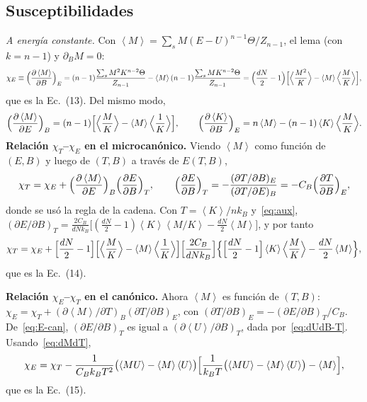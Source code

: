 \documentclass[11pt,letterpaper]{article}
\newcommand{\avg}[1]{\left\langle #1 \right\rangle}
\newcommand{\kB}{k_{B}}
\begin{document}
\subsection{Susceptibilidades}
\emph{A energía constante.} Con $\avg M=\sum_sM(E-U)^{n-1}\Theta/Z_{n-1}$, el lema
(con $k=n-1$) y $\partial_BM=0$:
\begin{equation}
\chi_E\equiv\Bigl(\frac{\partial\avg M}{\partial B}\Bigr)_E
=(n-1)\frac{\sum_sM^2K^{n-2}\Theta}{Z_{n-1}}-\avg M(n-1)\frac{\sum_sMK^{n-2}\Theta}{Z_{n-1}}
=\Bigl(\frac{dN}{2}-1\Bigr)\Bigl[\Bigl\langle\frac{M^2}{K}\Bigr\rangle-\avg M\Bigl\langle\frac MK\Bigr\rangle\Bigr],
\label{eq:chiE}
\end{equation}
que es la Ec.~(13). Del mismo modo,
\begin{equation}
\Bigl(\frac{\partial\avg M}{\partial E}\Bigr)_B=(n-1)\Bigl[\Bigl\langle\frac MK\Bigr\rangle-\avg M\Bigl\langle\frac1K\Bigr\rangle\Bigr],
\qquad
\Bigl(\frac{\partial\avg K}{\partial B}\Bigr)_E=n\avg M-(n-1)\avg K\Bigl\langle\frac MK\Bigr\rangle .
\label{eq:aux}
\end{equation}
\textbf{Relación $\chi_T$--$\chi_E$ en el microcanónico.} Viendo $\avg M$ como función de
$(E,B)$ y luego de $(T,B)$ a través de $E(T,B)$,
\begin{equation}
\chi_T=\chi_E+\Bigl(\frac{\partial\avg M}{\partial E}\Bigr)_B\Bigl(\frac{\partial E}{\partial B}\Bigr)_T,
\qquad
\Bigl(\frac{\partial E}{\partial B}\Bigr)_T=-\frac{(\partial T/\partial B)_E}{(\partial T/\partial E)_B}
=-C_B\Bigl(\frac{\partial T}{\partial B}\Bigr)_E ,
\end{equation}
donde se usó la regla de la cadena. Con $T=\avg K/n\kB$ y~\eqref{eq:aux},
$(\partial E/\partial B)_T=\frac{2C_B}{dN\kB}\bigl[(\frac{dN}{2}-1)\avg K\avg{M/K}-\frac{dN}{2}\avg M\bigr]$, y por tanto
\begin{equation}
\chi_T=\chi_E+\Bigl[\frac{dN}{2}-1\Bigr]\Bigl[\Bigl\langle\frac MK\Bigr\rangle-\avg M\Bigl\langle\frac1K\Bigr\rangle\Bigr]
\Bigl[\frac{2C_B}{dN\kB}\Bigr]
\Bigl\{\Bigl[\frac{dN}{2}-1\Bigr]\avg K\Bigl\langle\frac MK\Bigr\rangle-\frac{dN}{2}\avg M\Bigr\},
\end{equation}
que es la Ec.~(14).

\textbf{Relación $\chi_E$--$\chi_T$ en el canónico.} Ahora $\avg M$ es función de $(T,B)$:
$\chi_E=\chi_T+(\partial\avg M/\partial T)_B(\partial T/\partial B)_E$, con
$(\partial T/\partial B)_E=-(\partial E/\partial B)_T/C_B$. De~\eqref{eq:E-can},
$(\partial E/\partial B)_T$ es igual a $(\partial\avg U/\partial B)_T$, dada por~\eqref{eq:dUdB-T}. Usando~\eqref{eq:dMdT},
\begin{equation}
\chi_E=\chi_T-\frac{1}{C_B\kB T^2}\bigl(\avg{MU}-\avg M\avg U\bigr)
\Bigl[\frac{1}{\kB T}\bigl(\avg{MU}-\avg M\avg U\bigr)-\avg M\Bigr],
\end{equation}
que es la Ec.~(15).
\end{document}
